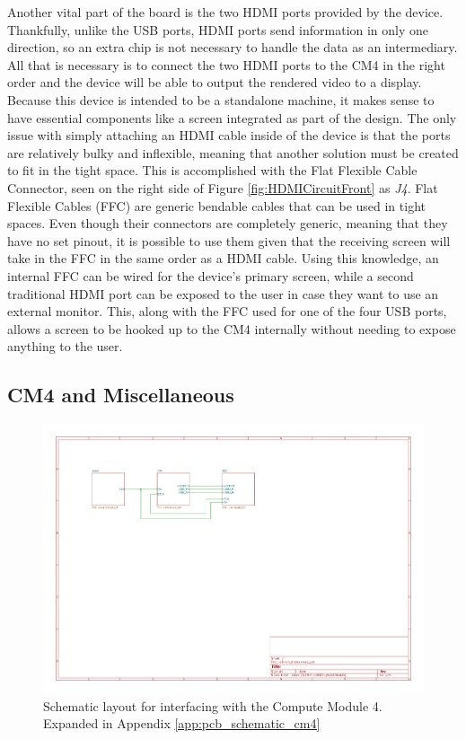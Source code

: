 Another vital part of the board is the two HDMI ports provided by the device.
Thankfully, unlike the USB ports, HDMI ports send information in only one direction, so an extra chip is not necessary to handle the data as an intermediary.
All that is necessary is to connect the two HDMI ports to the CM4 in the right order and the device will be able to output the rendered video to a display.
Because this device is intended to be a standalone machine, it makes sense to have essential components like a screen integrated as part of the design.
The only issue with simply attaching an HDMI cable inside of the device is that the ports are relatively bulky and inflexible, meaning that another solution must be created to fit in the tight space.
This is accomplished with the Flat Flexible Cable Connector, seen on the right side of Figure \ref{fig:HDMICircuitFront} as \emph{J4}.
Flat Flexible Cables (FFC) are generic bendable cables that can be used in tight spaces.
Even though their connectors are completely generic, meaning that they have no set pinout, it is possible to use them given that the receiving screen will take in the FFC in the same order as a HDMI cable.
Using this knowledge, an internal FFC can be wired for the device's primary screen, while a second traditional HDMI port can be exposed to the user in case they want to use an external monitor.
This, along with the FFC used for one of the four USB ports, allows a screen to be hooked up to the CM4 internally without needing to expose anything to the user.

\subsection{CM4 and Miscellaneous}\label{subsec:DesigningCM4}

\begin{figure}[t!]
  \centering
  \includegraphics[width=.75\textwidth,page=3]{Figures/kicad/lathrum_thesis_schematic.pdf}
  \caption[CM4 Schematic]{Schematic layout for interfacing with the Compute Module 4. Expanded in Appendix \ref{app:pcb_schematic_cm4}}
  \label{fig:pcb_schematic_cm4}
\end{figure}

